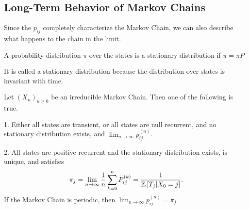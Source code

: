\subsection{Long-Term Behavior of Markov Chains}
Since the $p_{ij}$ completely characterize the Markov Chain, we can also describe what happens to the chain in the limit.
\begin{definition}
	A probability distribution $\pi$ over the states is a stationary distribution if $\pi = \pi P$
	\label{defn:stationary-dist-mc}
\end{definition}
It is called a stationary distribution because the distribution over states is invariant with time.
\begin{theorem}
	Let $(X_n)_{n\geq 0}$ be an irreducible Markov Chain. Then one of the following is true.

	1. Either all states are transient, or all states are null recurrent, and no stationary distribution exists, and $\lim_{n\to\infty}p_{ij}^{(n)}$.
	
	2. All states are positive recurrent and the stationary distribution exists, is unique, and satisfies \[
		\pi_j = \lim_{n\to\infty}\frac{1}{n}\sum_{k=0}^{n}P_{ij}^{(k)} = \frac{1}{\mathbb{E}\left[T_j|X_0=j\right]}.
		\]
		If the Markov Chain is periodic, then $\lim_{n\to\infty}p_{ij}^{(n)} = \pi_j$
	\label{thm:big-theorem}
\end{theorem}


